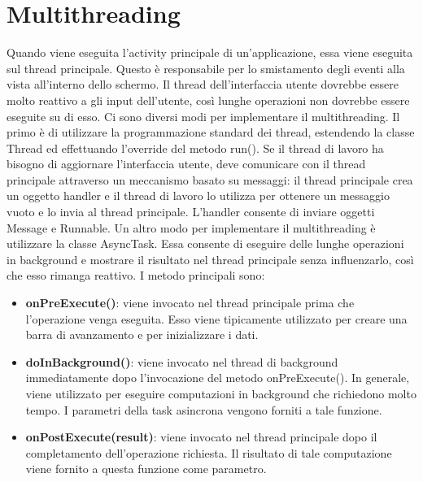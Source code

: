\section{Multithreading}
Quando viene eseguita l'activity principale di un'applicazione, essa viene eseguita sul thread principale. Questo è responsabile per lo smistamento degli eventi alla vista all'interno dello schermo.
Il thread dell'interfaccia utente dovrebbe essere molto reattivo a gli input dell'utente, così lunghe operazioni non dovrebbe essere eseguite su di esso. Ci sono diversi modi per implementare il multithreading.
Il primo è di utilizzare la programmazione standard dei thread, estendendo la classe Thread ed effettuando l'override del metodo run().
Se il thread di lavoro ha bisogno di aggiornare l'interfaccia utente, deve comunicare con il thread principale attraverso un meccanismo basato su messaggi: il thread principale crea un oggetto handler e il thread di lavoro lo utilizza per ottenere un messaggio vuoto e lo invia al thread principale. L'handler consente di inviare oggetti Message e Runnable.
Un altro modo per implementare il multithreading è utilizzare la classe AsyncTask.
Essa consente di eseguire delle lunghe operazioni in background e mostrare il risultato nel thread principale senza influenzarlo, così che esso rimanga reattivo. I metodo principali sono:
\begin{itemize}
    \item \textbf{onPreExecute()}: viene invocato nel thread principale prima che l’operazione venga eseguita. Esso viene tipicamente utilizzato per creare una barra di avanzamento e per inizializzare i dati.
    \item \textbf{doInBackground()}: viene invocato nel thread di background immediatamente dopo l’invocazione del metodo onPreExecute(). In generale, viene utilizzato per eseguire computazioni in background che richiedono molto tempo. I parametri della task asincrona vengono forniti a tale funzione.
    \item \textbf{onPostExecute(result)}: viene invocato nel thread principale dopo il completamento dell’operazione richiesta. Il risultato di tale computazione viene fornito a questa funzione come parametro.
\end{itemize}